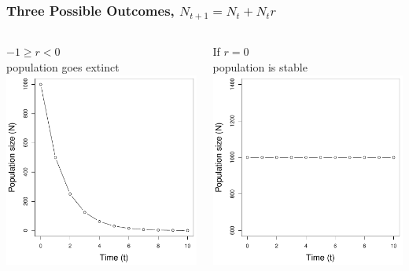 \documentclass[color=usenames,dvipsnames]{beamer}\usepackage[]{graphicx}\usepackage[]{color}
\begin{document}
\begin{frame}
  \frametitle{Three Possible Outcomes, $N_{t+1} = N_t + N_tr$}
  \begin{columns}
    \begin{column}{0.33\textwidth}
      \small
      \centering
      \If $-1 \geq r < 0$ \\ population goes extinct \\
      \includegraphics[width=\textwidth]{figs/rl0}
    \end{column}
    \begin{column}{0.33\textwidth}
      \small
      \centering
      If $r = 0$ \\ population is stable \\
      \includegraphics[width=\textwidth]{figs/r0}

\end{column}
\end{columns}
\end{frame}
\end{document}
